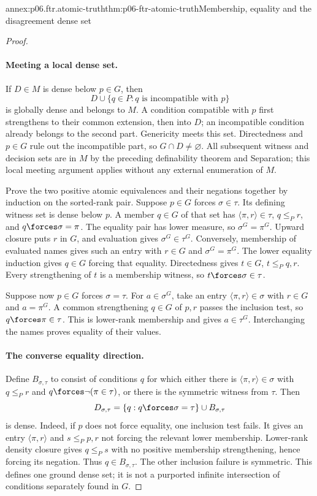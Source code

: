 \begin{annexitem}{annex:p06.ftr.atomic-truth}{thm:p06-ftr-atomic-truth}{Membership, equality and the disagreement dense set}
\begin{proof}
\paragraph{Meeting a local dense set.}
If \(D\in M\) is dense below \(p\in G\), then
\[
 D\cup\{q\in P:q\text{ is incompatible with }p\}
\]
is globally dense and belongs to \(M\). A condition compatible with
\(p\) first strengthens to their common extension, then into \(D\);
an incompatible condition already belongs to the second part.
Genericity meets this set. Directedness and \(p\in G\) rule out the
incompatible part, so \(G\cap D\ne\varnothing\).
All subsequent witness and decision sets are in \(M\) by the preceding
definability theorem and Separation; this local meeting argument applies
without any external enumeration of \(M\).

Prove the two positive atomic equivalences and their negations together
by induction on the sorted-rank pair. Suppose
\(p\in G\) forces \(\sigma\in\tau\). Its defining witness set is
dense below \(p\). A member \(q\in G\) of that set has
\(\langle\pi,r\rangle\in\tau\), \(q\leq_P r\), and
\(q\forces\sigma=\pi\). The equality pair has lower measure, so
\(\sigma^G=\pi^G\). Upward closure puts \(r\) in \(G\), and
evaluation gives \(\sigma^G\in\tau^G\).
Conversely, membership of evaluated names gives such an entry with
\(r\in G\) and \(\sigma^G=\pi^G\). The lower equality induction
gives \(q\in G\) forcing that equality. Directedness gives
\(t\in G\), \(t\leq_P q,r\). Every strengthening of \(t\) is a
membership witness, so \(t\forces\sigma\in\tau\).

Suppose now \(p\in G\) forces \(\sigma=\tau\). For
\(a\in\sigma^G\), take an entry \(\langle\pi,r\rangle\in\sigma\)
with \(r\in G\) and \(a=\pi^G\). A common strengthening
\(q\in G\) of \(p,r\) passes the inclusion test, so
\(q\forces\pi\in\tau\). This is lower-rank membership and gives
\(a\in\tau^G\). Interchanging the names proves equality of their values.

\paragraph{The converse equality direction.}
Define \(B_{\sigma,\tau}\) to consist of conditions \(q\) for which
either there is \(\langle\pi,r\rangle\in\sigma\) with
\(q\leq_P r\) and \(q\forces\neg(\pi\in\tau)\), or there is the
symmetric witness from \(\tau\). Then
\[
 D_{\sigma,\tau}
 =\{q:q\forces\sigma=\tau\}\cup B_{\sigma,\tau}
\]
is dense. Indeed, if \(p\) does not force equality, one inclusion
test fails. It gives an entry \(\langle\pi,r\rangle\) and
\(s\leq_P p,r\) not forcing the relevant lower membership.
Lower-rank density closure gives \(q\leq_P s\) with no positive
membership strengthening, hence forcing its negation. Thus
\(q\in B_{\sigma,\tau}\). The other inclusion failure is symmetric.
This defines one ground dense set; it is not a purported infinite
intersection of conditions separately found in \(G\).


\end{proof}
\end{annexitem}
